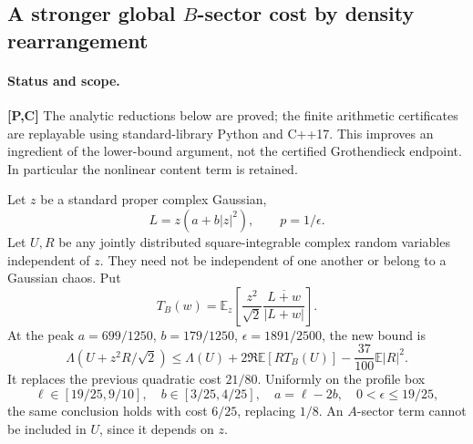 \subsection{A stronger global \(B\)-sector cost by density rearrangement}
\label{sec:b-density-rearrangement}

\paragraph{Status and scope.}
\textbf{[P,C]} The analytic reductions below are proved; the finite
arithmetic certificates are replayable using standard-library Python and
C++17.  This improves an ingredient of the lower-bound argument, not the
certified Grothendieck endpoint.  In particular the nonlinear content
term is retained.

Let \(z\) be a standard proper complex Gaussian,
\[
 L=z(a+b|z|^2),\qquad p=1/\epsilon.
\]
Let \(U,R\) be any jointly distributed square-integrable complex random
variables independent of \(z\).  They need not be independent of one
another or belong to a Gaussian chaos.  Put
\[
 T_B(w)=\mathbb E_z\left[
 \frac{z^2}{\sqrt2}\frac{\overline{L+w}}{|L+w|}\right].
\]
At the peak \(a=699/1250\), \(b=179/1250\),
\(\epsilon=1891/2500\), the new bound is
\begin{equation}
 \boxed{\Lambda(U+z^2R/\sqrt2)
 \leq\Lambda(U)+2\Re\mathbb E[R T_B(U)]
             -\frac{37}{100}\mathbb E|R|^2.}
 \label{eq:b-rearrange-peak}
\end{equation}
It replaces the previous quadratic cost \(21/80\).
Uniformly on the profile box
\[
 \ell\in[19/25,9/10],\quad b\in[3/25,4/25],\quad
 a=\ell-2b,\quad 0<\epsilon\leq19/25,
\]
the same conclusion holds with cost \(6/25\), replacing \(1/8\).
An \(A\)-sector term cannot be included in \(U\), since it depends on \(z\).

